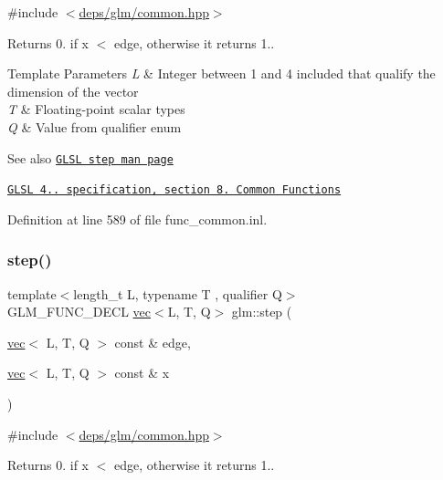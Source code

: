 {\ttfamily \#include $<$\hyperlink{common_8hpp}{deps/glm/common.\+hpp}$>$}

Returns 0. if x $<$ edge, otherwise it returns 1..


\begin{DoxyTemplParams}{Template Parameters}
{\em L} & Integer between 1 and 4 included that qualify the dimension of the vector \\
\hline
{\em T} & Floating-\/point scalar types \\
\hline
{\em Q} & Value from qualifier enum\\
\hline
\end{DoxyTemplParams}
\begin{DoxySeeAlso}{See also}
\href{http://www.opengl.org/sdk/docs/manglsl/xhtml/step.xml}{\tt G\+L\+SL step man page} 

\href{http://www.opengl.org/registry/doc/GLSLangSpec.4.20.8.pdf}{\tt G\+L\+SL 4.. specification, section 8. Common Functions} 
\end{DoxySeeAlso}


Definition at line 589 of file func\+\_\+common.\+inl.

\mbox{\label{group__core__func__common_gaf4a5fc81619c7d3e8b22f53d4a098c7f}} 
\subsubsection{\texorpdfstring{step()}{step()}\hspace{0.1cm}{\footnotesize\ttfamily [3/3]}}
{\footnotesize\ttfamily template$<$length\+\_\+t L, typename T , qualifier Q$>$ \\
G\+L\+M\+\_\+\+F\+U\+N\+C\+\_\+\+D\+E\+CL \hyperlink{structglm_1_1vec}{vec}$<$L, T, Q$>$ glm\+::step (\begin{DoxyParamCaption}\item[{\hyperlink{structglm_1_1vec}{vec}$<$ L, T, Q $>$ const \&}]{edge,  }\item[{\hyperlink{structglm_1_1vec}{vec}$<$ L, T, Q $>$ const \&}]{x }\end{DoxyParamCaption})}



{\ttfamily \#include $<$\hyperlink{common_8hpp}{deps/glm/common.\+hpp}$>$}

Returns 0. if x $<$ edge, otherwise it returns 1..


